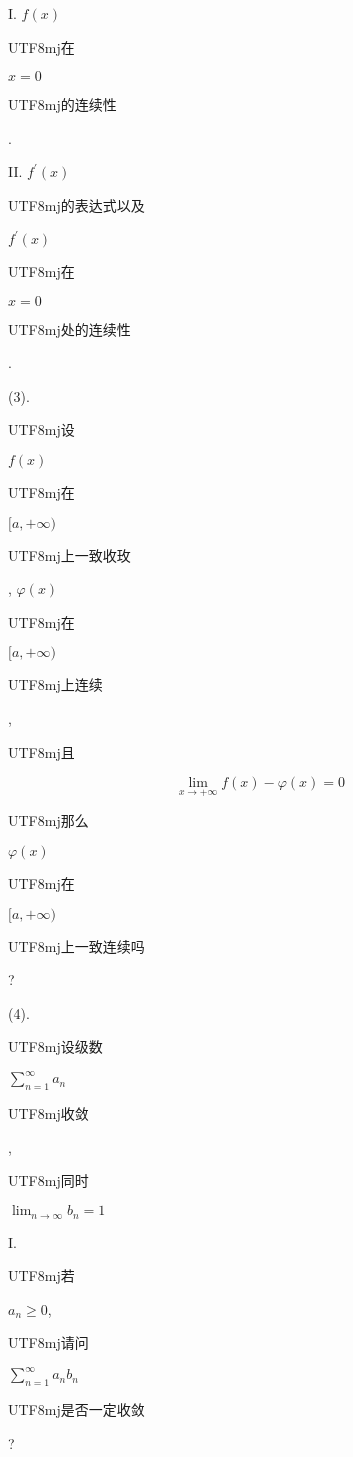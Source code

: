 \documentclass[10pt]{article}
\begin{document}
I. $f(x)$ \begin{CJK}{UTF8}{mj}在\end{CJK} $x=0$ \begin{CJK}{UTF8}{mj}的连续性\end{CJK}.

II. $f^{\prime}(x)$ \begin{CJK}{UTF8}{mj}的表达式以及\end{CJK} $f^{\prime}(x)$ \begin{CJK}{UTF8}{mj}在\end{CJK} $x=0$ \begin{CJK}{UTF8}{mj}处的连续性\end{CJK}.

(3). \begin{CJK}{UTF8}{mj}设\end{CJK} $f(x)$ \begin{CJK}{UTF8}{mj}在\end{CJK} $[a,+\infty)$ \begin{CJK}{UTF8}{mj}上一致收玫\end{CJK}, $\varphi(x)$ \begin{CJK}{UTF8}{mj}在\end{CJK} $[a,+\infty)$ \begin{CJK}{UTF8}{mj}上连续\end{CJK}, \begin{CJK}{UTF8}{mj}且\end{CJK}
$$
\lim _{x \rightarrow+\infty} f(x)-\varphi(x)=0
$$
\begin{CJK}{UTF8}{mj}那么\end{CJK} $\varphi(x)$ \begin{CJK}{UTF8}{mj}在\end{CJK} $[a,+\infty)$ \begin{CJK}{UTF8}{mj}上一致连续吗\end{CJK}?

(4). \begin{CJK}{UTF8}{mj}设级数\end{CJK} $\sum_{n=1}^{\infty} a_{n}$ \begin{CJK}{UTF8}{mj}收敛\end{CJK}, \begin{CJK}{UTF8}{mj}同时\end{CJK} $\lim _{n \rightarrow \infty} b_{n}=1$

I. \begin{CJK}{UTF8}{mj}若\end{CJK} $a_{n} \geq 0$, \begin{CJK}{UTF8}{mj}请问\end{CJK} $\sum_{n=1}^{\infty} a_{n} b_{n}$ \begin{CJK}{UTF8}{mj}是否一定收敛\end{CJK}?
\end{document}
